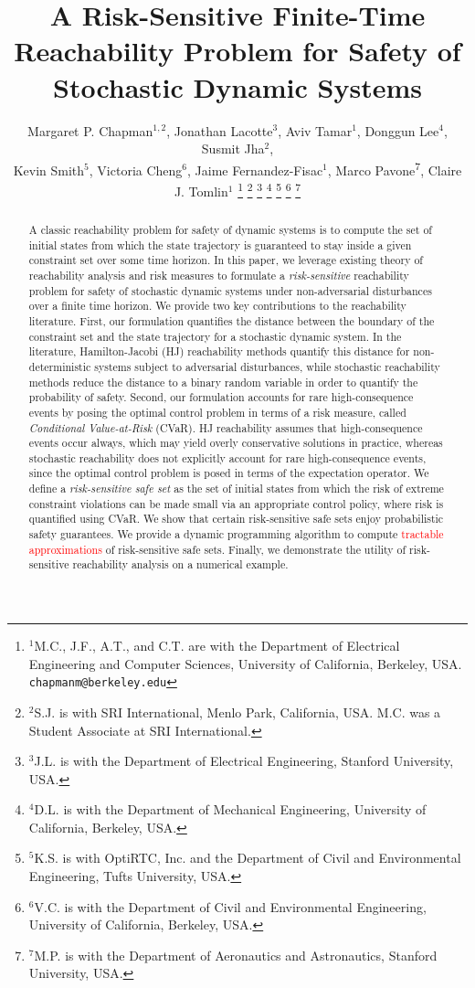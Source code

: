 \documentclass[letterpaper, 10 pt, conference]{ieeeconf}  %
\title{\LARGE \bf
A Risk-Sensitive Finite-Time Reachability Problem for Safety of Stochastic Dynamic Systems}
\author{Margaret P. Chapman$^{1,2}$, Jonathan Lacotte$^{3}$, Aviv Tamar$^{1}$, Donggun Lee$^{4}$, Susmit Jha$^{2}$, \\
Kevin Smith$^{5}$, Victoria Cheng$^{6}$, Jaime Fernandez-Fisac$^{1}$, Marco Pavone\textsuperscript{7}, Claire J. Tomlin$^{1}$%
\thanks{$^{1}$M.C., J.F., A.T., and C.T. are with the Department of Electrical Engineering and Computer Sciences, University of California, Berkeley, USA.
        {\tt\small chapmanm@berkeley.edu}}%
\thanks{$^{2}$S.J. is with SRI International, Menlo Park, California, USA. M.C. was a Student Associate at SRI International.
        }%
\thanks{$^{3}$J.L. is with the Department of Electrical Engineering, Stanford University, USA.
        }%
\thanks{$^{4}$D.L. is with the Department of Mechanical Engineering, University of California, Berkeley, USA.
        }%
\thanks{$^{5}$K.S. is with OptiRTC, Inc. and the Department of Civil and Environmental Engineering, Tufts University, USA.
        }%
\thanks{$^{6}$V.C. is with the Department of Civil and Environmental Engineering, University of California, Berkeley, USA.
        }%
        \thanks{$^{7}$M.P. is with the Department of Aeronautics and Astronautics, Stanford University, USA.
        }%
}
\begin{document}
\maketitle
\thispagestyle{empty}
\pagestyle{empty}

\begin{abstract}
A classic reachability problem for safety of dynamic systems is to compute the set of initial states from which 
the state trajectory is guaranteed to stay inside a given constraint set over some time horizon. 
In this paper, we leverage existing theory of reachability analysis and risk measures 
to formulate a \textit{risk-sensitive} reachability problem for safety of stochastic dynamic systems under non-adversarial disturbances
over a finite time horizon.
We provide two key contributions to the reachability literature. 
First, our formulation quantifies the distance between the boundary of the constraint set and the state trajectory for a stochastic dynamic system.
In the literature, Hamilton-Jacobi (HJ) reachability methods quantify this distance for non-deterministic systems subject to adversarial disturbances, while
stochastic reachability methods reduce the distance to a binary random variable in order to quantify the probability of safety. 
Second, our formulation accounts for rare high-consequence events by posing the optimal control problem in terms of a risk measure, 
called \textit{Conditional Value-at-Risk} (CVaR).
HJ reachability assumes that high-consequence events occur always, which may yield overly conservative solutions in practice,
whereas stochastic reachability does not explicitly account for rare high-consequence events,
since the optimal control problem is posed in terms of the expectation operator.
We define a \textit{risk-sensitive safe set} as the set of initial states from which the risk of extreme constraint violations
can be made small via an appropriate control policy, where risk is quantified using CVaR.
We show that certain risk-sensitive safe sets enjoy probabilistic safety guarantees.
We provide a dynamic programming algorithm to compute \textcolor{red}{tractable approximations} of risk-sensitive safe sets.
Finally, we demonstrate the utility of risk-sensitive reachability analysis on a numerical example.
\end{abstract}
\end{document}
